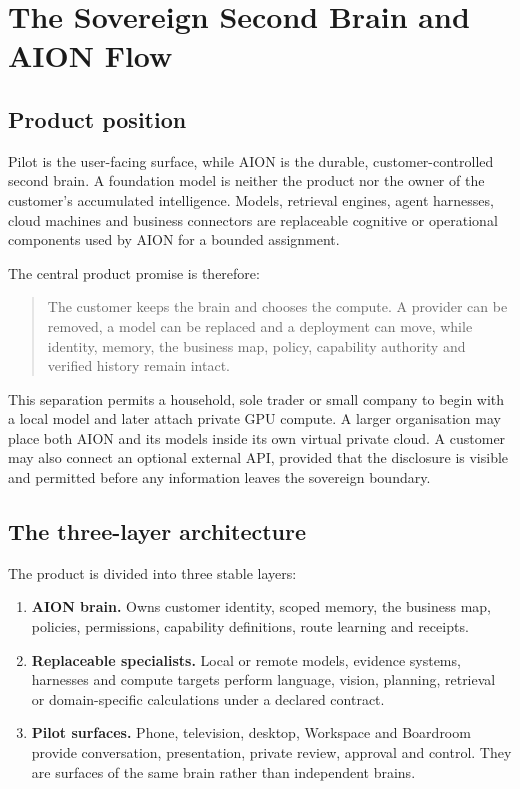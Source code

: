 \section{The Sovereign Second Brain and AION Flow}
\label{sec:sovereign-second-brain-flow}

\subsection{Product position}

Pilot is the user-facing surface, while AION is the durable, customer-controlled
second brain.  A foundation model is neither the product nor the owner of the
customer's accumulated intelligence.  Models, retrieval engines, agent harnesses,
cloud machines and business connectors are replaceable cognitive or operational
components used by AION for a bounded assignment.

The central product promise is therefore:

\begin{quote}
The customer keeps the brain and chooses the compute.  A provider can be removed,
a model can be replaced and a deployment can move, while identity, memory, the
business map, policy, capability authority and verified history remain intact.
\end{quote}

This separation permits a household, sole trader or small company to begin with a
local model and later attach private GPU compute.  A larger organisation may place
both AION and its models inside its own virtual private cloud.  A customer may also
connect an optional external API, provided that the disclosure is visible and
permitted before any information leaves the sovereign boundary.

\subsection{The three-layer architecture}

The product is divided into three stable layers:

\begin{enumerate}
  \item \textbf{AION brain.} Owns customer identity, scoped memory, the business
  map, policies, permissions, capability definitions, route learning and receipts.
  \item \textbf{Replaceable specialists.} Local or remote models, evidence
  systems, harnesses and compute targets perform language, vision, planning,
  retrieval or domain-specific calculations under a declared contract.
  \item \textbf{Pilot surfaces.} Phone, television, desktop, Workspace and
  Boardroom provide conversation, presentation, private review, approval and
  control.  They are surfaces of the same brain rather than independent brains.
\end{enumerate}

